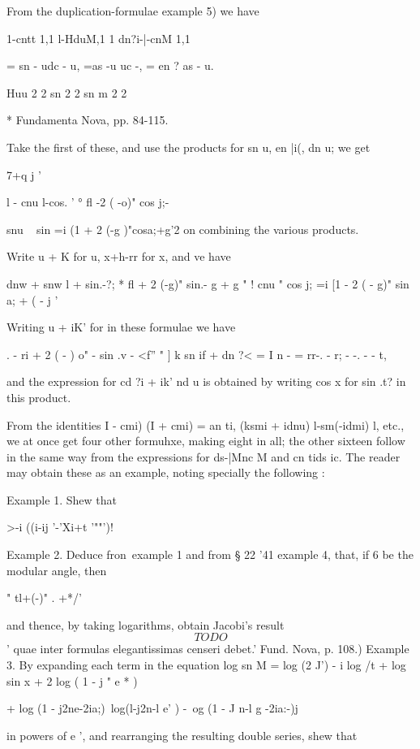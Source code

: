 From the duplication-formulae  example 5) we have

1-cntt 1,1 l-HduM,1 1 dn?i-|-cnM 1,1

= sn - udc - u, =as -u uc -,  = en ? as - u.

Huu 2 2 sn 2 2 sn m 2 2

* Fundamenta Nova, pp. 84-115.

%
%

Take the first of these, and use the products for sn u, en |i(, dn u;
we get

7+q j '

l - cnu l-cos. ' ° fl -2 ( -o)" cos j;-

snu ~ sin =i (1 + 2 (-g )"cosa;+g'2 on combining the various products.

Write u + K for u, x+h-rr for x, and ve have

dnw + snw l + sin.-?; * fl + 2 (-g)" sin.- g + g " ! cnu " cos j; =i
[1 - 2 ( - g)" sin a; + ( - j '

Writing u + iK' for in these formulae we have

. - ri + 2  ( - ) o" - sin .v - <f'' " ] k sn if + dn ?< = I n - =
rr-. - r; - -. - - t,

and the expression for cd ?i + ik' nd u is obtained by writing cos x
for sin .t? in this product.

From the identities I - cmi) (I + cmi) = an ti, (ksmi + idnu)
l-sm(-idmi) l, etc., we at once get four other formuhxe, making eight
in all; the other sixteen follow in the same way from the expressions
for ds-|Mnc M and cn tids ic. The reader may obtain these as an
example, noting specially the following :

Example 1. Shew that

  >-i ((i-ij '-'Xi+t '""')!

Example 2. Deduce fron\ example 1 and from § 22 '41 example 4, that,
if 6 be the modular angle, then

" tl+(-)" . +*/'

and thence, by taking logarithms, obtain Jacobi's result
$$
TODO
$$
' quae inter formulas elegantissimas censeri debet.' Fund. Nova, p.
108.) Example 3. By expanding each term in the equation log sn M = log
(2 J') - i log /t + log sin x + 2 log ( 1 - j " e * )

+ log (1 - j2ne-2ia;)\ log(l-j2n-l e' ) -\ og (1 - J n-l g -2ia:-)j

in powers of e ', and rearranging the resulting double series, shew
that

